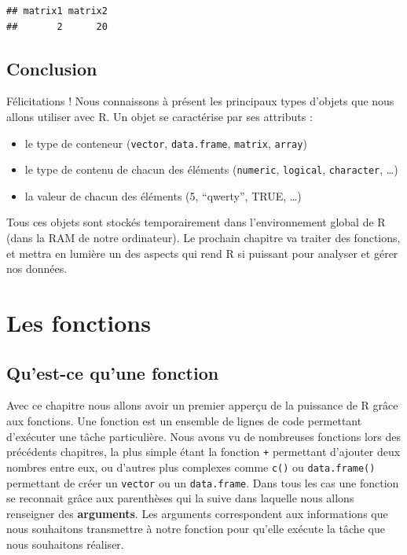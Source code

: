 \documentclass[]{book}
\providecommand{\tightlist}{%
  \setlength{\itemsep}{0pt}\setlength{\parskip}{0pt}}
\begin{document}
\begin{verbatim}
## matrix1 matrix2 
##       2      20
\end{verbatim}

\hypertarget{conclusion-3}{%
\section{Conclusion}\label{conclusion-3}}

Félicitations ! Nous connaissons à présent les principaux types d'objets que nous allons utiliser avec R. Un objet se caractérise par ses attributs :

\begin{itemize}
\tightlist
\item
  le type de conteneur (\texttt{vector}, \texttt{data.frame}, \texttt{matrix}, \texttt{array})
\item
  le type de contenu de chacun des éléments (\texttt{numeric}, \texttt{logical}, \texttt{character}, \ldots)
\item
  la valeur de chacun des éléments (5, ``qwerty'', TRUE, \ldots)
\end{itemize}

Tous ces objets sont stockés temporairement dans l'environnement global de R (dans la RAM de notre ordinateur). Le prochain chapitre va traiter des fonctions, et mettra en lumière un des aspects qui rend R si puissant pour analyser et gérer nos données.

\hypertarget{fonctions}{%
\chapter{Les fonctions}\label{fonctions}}

\hypertarget{quest-ce-quune-fonction}{%
\section{Qu'est-ce qu'une fonction}\label{quest-ce-quune-fonction}}

Avec ce chapitre nous allons avoir un premier apperçu de la puissance de R grâce aux fonctions. Une fonction est un ensemble de lignes de code permettant d'exécuter une tâche particulière. Nous avons vu de nombreuses fonctions lors des précédents chapitres, la plus simple étant la fonction \texttt{+} permettant d'ajouter deux nombres entre eux, ou d'autres plus complexes comme \texttt{c()} ou \texttt{data.frame()} permettant de créer un \texttt{vector} ou un \texttt{data.frame}. Dans tous les cas une fonction se reconnait grâce aux parenthèses qui la suive dans laquelle nous allons renseigner des \textbf{arguments}. Les arguments correspondent aux informations que nous souhaitons transmettre à notre fonction pour qu'elle exécute la tâche que nous souhaitons réaliser.
\end{document}
